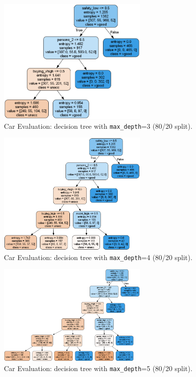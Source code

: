 \begin{figure}[H]
	\centering
	\includegraphics[width=0.65\textwidth]{imgs/dt-mini/dt__car_evaluation__80_vs_20__3.png}
	\caption{Car Evaluation: decision tree with \texttt{max\_depth}=3 (80/20 split).}\label{fig:ce-dt-depth-3}
\end{figure}

\begin{figure}[H]
	\centering
	\includegraphics[width=0.65\textwidth]{imgs/dt-mini/dt__car_evaluation__80_vs_20__4.png}
	\caption{Car Evaluation: decision tree with \texttt{max\_depth}=4 (80/20 split).}\label{fig:ce-dt-depth-4}
\end{figure}

\begin{figure}[H]
	\centering
	\includegraphics[width=0.65\textwidth]{imgs/dt-mini/dt__car_evaluation__80_vs_20__5.png}
	\caption{Car Evaluation: decision tree with \texttt{max\_depth}=5 (80/20 split).}\label{fig:ce-dt-depth-5}
\end{figure}

